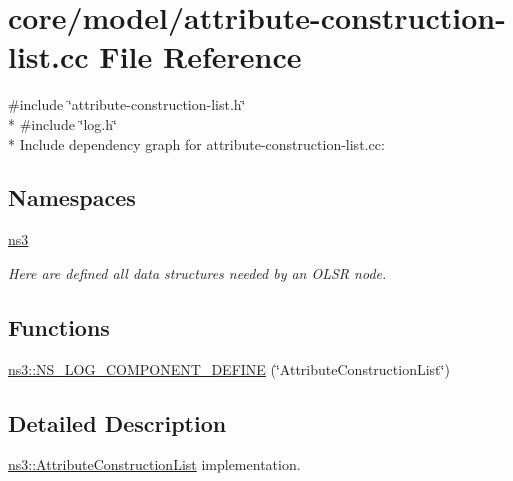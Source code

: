 \hypertarget{attribute-construction-list_8cc}{}\section{core/model/attribute-\/construction-\/list.cc File Reference}
\label{attribute-construction-list_8cc}
{\ttfamily \#include \char`\"{}attribute-\/construction-\/list.\+h\char`\"{}}\\*
{\ttfamily \#include \char`\"{}log.\+h\char`\"{}}\\*
Include dependency graph for attribute-\/construction-\/list.cc\+:
\subsection*{Namespaces}
\begin{DoxyCompactItemize}
\item 
 \hyperlink{namespacens3}{ns3}
\begin{DoxyCompactList}\small\item\em Here are defined all data structures needed by an O\+L\+SR node. \end{DoxyCompactList}\end{DoxyCompactItemize}
\subsection*{Functions}
\begin{DoxyCompactItemize}
\item 
\hyperlink{namespacens3_a343d276d517db09e457ad05f291e326e}{ns3\+::\+N\+S\+\_\+\+L\+O\+G\+\_\+\+C\+O\+M\+P\+O\+N\+E\+N\+T\+\_\+\+D\+E\+F\+I\+NE} (\char`\"{}Attribute\+Construction\+List\char`\"{})
\end{DoxyCompactItemize}


\subsection{Detailed Description}
\hyperlink{classns3_1_1AttributeConstructionList}{ns3\+::\+Attribute\+Construction\+List} implementation. 